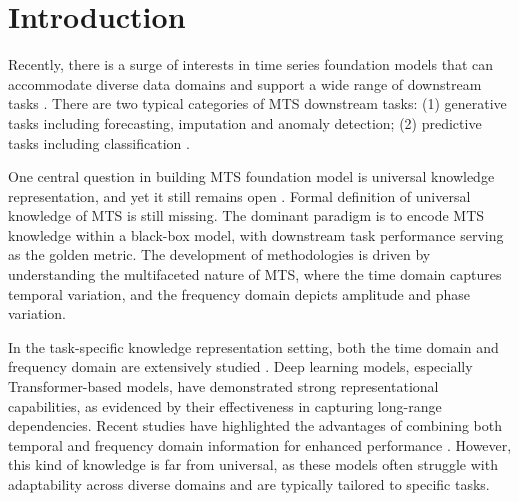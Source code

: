 \section{Introduction}
\label{intro}

Recently, there is a surge of interests 
in time series foundation models that 
can accommodate diverse data domains and 
support a wide range of downstream tasks \cite{Wu23,gao24}.  
There are two typical categories of MTS downstream tasks: 
(1) generative tasks including forecasting, imputation and anomaly detection; 
(2) predictive tasks including classification \cite{gao24}.  
 
One central question in building MTS foundation model 
is universal knowledge representation, 
and yet it still remains open \cite{gao24}.  
Formal definition of universal knowledge of MTS 
is still missing.  
The dominant paradigm is to encode MTS knowledge within a black-box model, 
with downstream task performance serving as the golden metric\cite{Zhou23,Rasul23,Ekambaram24,Shi24,gao24}. 
The development of methodologies is driven by understanding the multifaceted nature of MTS, where the time domain captures temporal variation, and the frequency domain depicts amplitude and phase variation. 
            
In the task-specific knowledge representation setting, 
both the time domain and frequency domain are extensively 
studied \cite{Piao24, Wang24,Zhou22,Wangsy24}. 
Deep learning models, especially Transformer-based models, have demonstrated strong representational capabilities, as evidenced by their effectiveness in capturing long-range dependencies\cite{Piao24, Wang24}. 
Recent studies have highlighted the advantages 
of combining both temporal and frequency domain information for enhanced performance \cite{Zhou22,Wangsy24}.  
However, this kind of knowledge is far from universal, as these models often struggle with adaptability across diverse domains and are typically tailored to specific tasks.   

